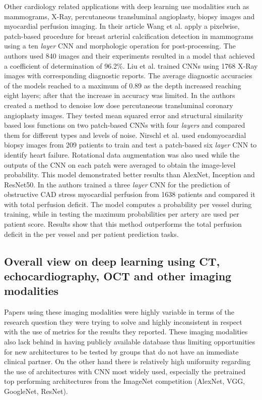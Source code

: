 \documentclass[journal]{IEEEtran}
\begin{document}
Other cardiology related applications with deep learning use modalities such as mammograms, X-Ray, percutaneous transluminal angioplasty, biopsy images and myocardial perfusion imaging.
In their article Wang et al.\cite{wang2017detecting} apply a pixelwise, patch-based procedure for breast arterial calcification detection in mammograms using a ten \textit{layer} CNN and morphologic operation for post-processing.
The authors used 840 images and their experiments resulted in a model that achieved a coefficient of determination of 96.2\%.
Liu et al.\cite{liu2017coronary} trained CNNs using 1768 X-Ray images with corresponding diagnostic reports.
The average diagnostic accuracies of the models reached to a maximum of 0.89 as the depth increased reaching eight layers; after that the increase in accuracy was limited.
In\cite{pavoni2017image} the authors created a method to denoise low dose percutaneous transluminal coronary angioplasty images.
They tested mean squared error and structural similarity based loss functions on two patch-based CNNs with four \textit{layers} and compared them for different types and levels of noise.
Nirschl et al.\cite{nirschl2018deep} used endomyocardial biopsy images from 209 patients to train and test a patch-based six \textit{layer} CNN to identify heart failure.
Rotational data augmentation was also used while the outputs of the CNN on each patch were averaged to obtain the image-level probability.
This model demonstrated better results than AlexNet, Inception and ResNet50.
In\cite{betancur2018deep} the authors trained a three \textit{layer} CNN for the prediction of obstructive CAD stress myocardial perfusion from 1638 patients and compared it with total perfusion deficit.
The model computes a probability per vessel during training, while in testing the maximum probabilities per artery are used per patient score.
Results show that this method outperforms the total perfusion deficit in the per vessel and per patient prediction tasks.

\subsection{Overall view on deep learning using CT, echocardiography, OCT and other imaging modalities}
Papers using these imaging modalities were highly variable in terms of the research question they were trying to solve and highly inconsistent in respect with the use of metrics for the results they reported.
These imaging modalities also lack behind in having publicly available database thus limiting opportunities for new architectures to be tested by groups that do not have an immediate clinical partner.
On the other hand there is relatively high uniformity regarding the use of architectures with CNN most widely used, especially the pretrained top performing architectures from the ImageNet competition (AlexNet, VGG, GoogleNet, ResNet).
\end{document}
